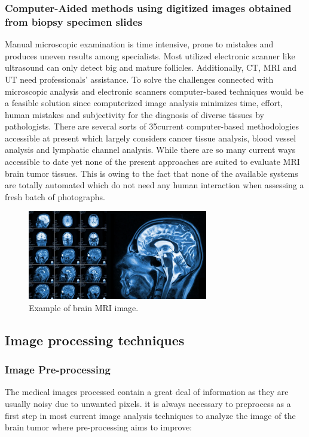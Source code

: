 \subsubsection{Computer-Aided methods using digitized images obtained from biopsy
  specimen slides}
Manual microscopic examination is time intensive, prone to mistakes
and produces uneven results among specialists. Most utilized electronic
scanner like ultrasound can only detect big and mature follicles. Additionally, CT, MRI and UT need professionals’ assistance. To solve the
challenges connected with microscopic analysis and electronic scanners
computer-based techniques would be a feasible solution since computerized
image analysis minimizes time, effort, human mistakes and subjectivity for
the diagnosis of diverse tissues by pathologists. There are several sorts of
35current computer-based methodologies accessible at present which largely
considers cancer tissue analysis, blood vessel analysis and lymphatic channel analysis. While there are so many current ways accessible to date yet
none of the present approaches are suited to evaluate MRI brain tumor
tissues. This is owing to the fact that none of the available systems are totally automated which do not need any human interaction when assessing
a fresh batch of photographs.
\begin{figure}[H]
  \centering
  \includegraphics[width=0.7\textwidth]{Images/Chapter1/mri.png}
  \caption{Example of brain MRI image. \cite{sjra2023brainmri}}
  \label{fig:mri}
\end{figure}
\subsection{Image processing techniques}

\subsubsection{Image Pre-processing}
The medical images processed contain a great deal of information as
they are usually noisy due to unwanted pixels. it is always necessary to preprocess as a first step in most current image analysis techniques to analyze
the image of the brain tumor where pre-processing aims to improve:

